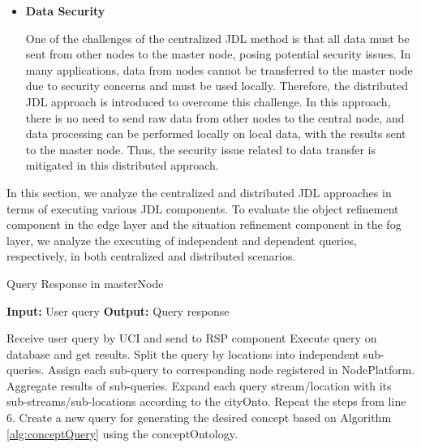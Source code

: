 \documentclass[5p,times]{elsarticle}
\begin{document}
\begin{itemize}
    \item \textbf{Data Security}


 One of the challenges of the centralized JDL method is that all data must be sent from other nodes to the master node, posing potential security issues. In many applications, data from nodes cannot be transferred to the master node due to security concerns and must be used locally. Therefore, the distributed JDL approach is introduced to overcome this challenge. In this approach, there is no need to send raw data from other nodes to the central node, and data processing can be performed locally on local data, with the results sent to the master node. Thus, the security issue related to data transfer is mitigated in this distributed approach.
\end{itemize}



In this section, we analyze the centralized and distributed JDL approaches in terms of executing various JDL components.
To evaluate the object refinement component in the edge layer and the situation refinement component in the fog layer, we analyze the executing of independent and dependent queries, respectively, in both centralized and distributed scenarios.


\begin{algorithm}[t]
  \caption{Query Response in masterNode}
  \label{alg:QueryresponsemasterNode}
  \begin{algorithmic}[1]
      \State \textbf{Input:} User query 
      \State \textbf{Output:} Query response

      \State Receive user query by UCI and send to RSP component
          \State Execute query on database and get results.
                  \State Split the query by locations into independent sub-queries.
                  \State Assign each sub-query to corresponding node registered in NodePlatform.
                  \State Aggregate results of sub-queries. 
              \Else
                  \State Expand each query stream/location with its 
                  sub-streams/sub-locations according to the cityOnto.
                  \State Repeat the steps from line 6.
              \EndIf
          \Else
              \State Create a new query for generating the desired concept 
              based on Algorithm \ref{alg:conceptQuery} using the conceptOntology.
          \EndIf
      \EndIf
  \end{algorithmic}
\end{algorithm}
\end{document}
